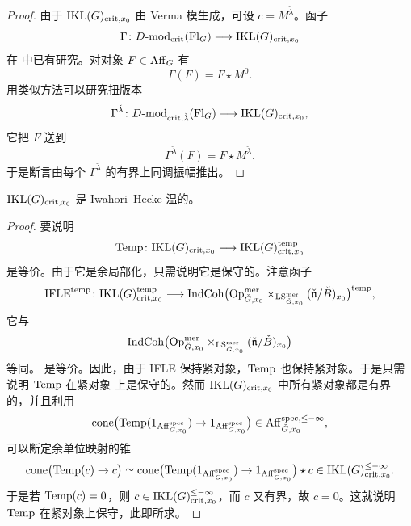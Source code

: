 \begin{proof}
由于 $\mathrm{IKL}(G)_{\mathrm{crit},x_0}$ 由 Verma 模生成，可设 $c=M^{\check\lambda}$。函子
\[
\Gamma\colon D\text{-}\mathrm{mod}_{\mathrm{crit}}(\mathrm{Fl}_G)\longrightarrow
\mathrm{IKL}(G)_{\mathrm{crit},x_0}
\]
在 \cite{FG09} 中已有研究。对对象 $F\in \mathrm{Aff}_G$ 有
\[
\Gamma(F)=F\star M^{0}.
\]
用类似方法可以研究扭版本
\[
\Gamma^{\check\lambda}\colon
D\text{-}\mathrm{mod}_{\mathrm{crit},\check\lambda}(\mathrm{Fl}_G)\longrightarrow
\mathrm{IKL}(G)_{\mathrm{crit},x_0},
\]
它把 $F$ 送到
\[
\Gamma^{\check\lambda}(F)=F\star M^{\check\lambda}.
\]
于是断言由每个 $\Gamma^{\check\lambda}$ 的有界上同调振幅推出。
\end{proof}

\begin{proposition}\label{prop:3.4.4.7}
$\mathrm{IKL}(G)_{\mathrm{crit},x_0}$ 是 Iwahori–Hecke 温的。
\end{proposition}

\begin{proof}
要说明
\[
\mathrm{Temp}\colon \mathrm{IKL}(G)_{\mathrm{crit},x_0}\longrightarrow
\mathrm{IKL}(G)^{\mathrm{temp}}_{\mathrm{crit},x_0}
\]
是等价。由于它是余局部化，只需说明它是保守的。注意函子
\[
\mathrm{IFLE}^{\mathrm{temp}}\colon
\mathrm{IKL}(G)^{\mathrm{temp}}_{\mathrm{crit},x_0}\longrightarrow
\mathrm{IndCoh}\bigl(\mathrm{Op}^{\mathrm{mer}}_{\check G,x_0}
\times_{\mathrm{LS}^{\mathrm{mer}}_{\check G,x_0}}(\check{\mathfrak{n}}/\check B)_{x_0}\bigr)^{\mathrm{temp}},
\]
它与
\[
\mathrm{IndCoh}\bigl(\mathrm{Op}^{\mathrm{mer}}_{\check G,x_0}
\times_{\mathrm{LS}^{\mathrm{mer}}_{\check G,x_0}}(\check{\mathfrak{n}}/\check B)_{x_0}\bigr)
\]
等同。
是等价。因此，由于 IFLE 保持紧对象，$\mathrm{Temp}$ 也保持紧对象。于是只需说明 $\mathrm{Temp}$ 在紧对象
上是保守的。然而 $\mathrm{IKL}(G)_{\mathrm{crit},x_0}$ 中所有紧对象都是有界的，并且利用
\[
\operatorname{cone}\bigl(\mathrm{Temp}(1_{\mathrm{Aff}^{\mathrm{spec}}_{G,x_0}})
\to 1_{\mathrm{Aff}^{\mathrm{spec}}_{G,x_0}}\bigr)
\in \mathrm{Aff}^{\mathrm{spec},\leq -\infty}_{\check G,x_0},
\]
可以断定余单位映射的锥
\[
\operatorname{cone}\bigl(\mathrm{Temp}(c)\to c\bigr)
\simeq
\operatorname{cone}\bigl(\mathrm{Temp}(1_{\mathrm{Aff}^{\mathrm{spec}}_{G,x_0}})
\to 1_{\mathrm{Aff}^{\mathrm{spec}}_{G,x_0}}\bigr)\star c
\in \mathrm{IKL}(G)^{\leq -\infty}_{\mathrm{crit},x_0}.
\]
于是若 $\mathrm{Temp}(c)=0$，则
$c\in \mathrm{IKL}(G)^{\leq -\infty}_{\mathrm{crit},x_0}$，而 $c$ 又有界，故 $c=0$。这就说明 $\mathrm{Temp}$
在紧对象上保守，此即所求。
\end{proof}
